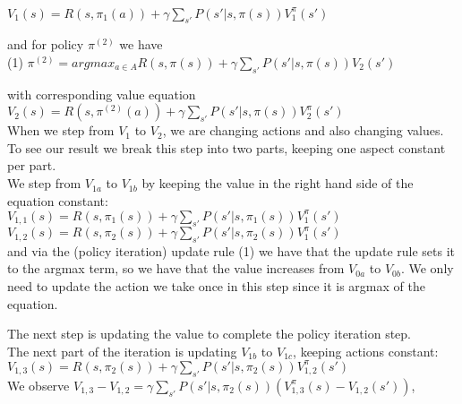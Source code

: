\documentclass[12pt,letterpaper]{article}
\begin{document}
\begin{enumerate}[label={(\alph*) }]
$\displaystyle{V_1(s) = R(s, \pi_1(a)) +  \gamma \sum_{s'}{P(s' | s, \pi(s))V_1^{\pi}(s')}}$ 

and for policy $\pi^{(2)}$ we have \\

(1) $\displaystyle{\pi^{(2)} = argmax_{a \in A} R(s, \pi(s)) + \gamma \sum_{s'}{P(s' | s, \pi(s))V_2(s')}}$

 with corresponding value equation $\displaystyle{V_2(s) = R(s, \pi^{(2)}(a)) +  \gamma \sum_{s'}{P(s' | s, \pi(s))V_2^{\pi}(s')}}$ \\

When we step from $V_1$ to $V_2$, we are changing actions and also changing values. To see our result we break this step into two parts, keeping one aspect constant per part. \\

We step from $V_{1a}$ to $V_{1b}$ by keeping the value in the right hand side of the equation constant: \\
$ V_{1,1}(s) = R(s, \pi_1(s)) +  \gamma \sum_{s'}{P(s' | s, \pi_1(s))V_1^{\pi}(s')}$ \\
$ V_{1,2}(s) = R(s, \pi_2(s)) +  \gamma \sum_{s'}{P(s' | s, \pi_2(s))V_1^{\pi}(s')}$ \\

and via the (policy iteration) update rule (1) we have that the update rule sets it to the argmax term, so we have that the value increases from $V_{0a}$ to $V_{0b}$. We only need to update the action we take once in this step since it is argmax of the equation.

The next step is updating the value to complete the policy iteration step. \\

The next part of the iteration is updating $V_{1b}$ to $V_{1c}$, keeping actions constant: \\

$V_{1,3}(s) = R(s, \pi_2(s)) +  \gamma \sum_{s'}{P(s' | s, \pi_2(s))V_{1,2}^{\pi}(s')}$ \\

We observe $V_{1,3} - V_{1,2} = \gamma \sum_{s'}{P(s' | s, \pi_2(s))(V_{1,3}^{\pi}(s) - V_{1,2}(s'))}$, \\


\end{enumerate}
\end{document}
